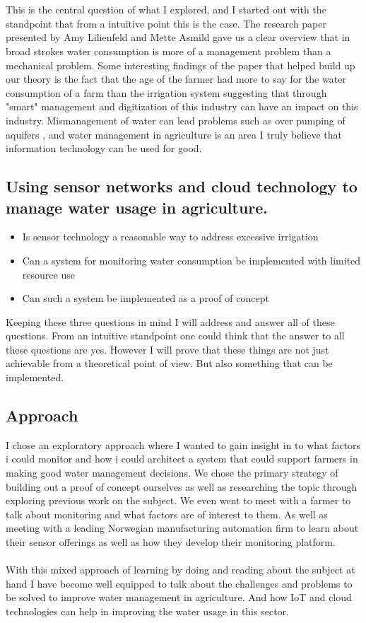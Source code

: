 \documentclass[]{uiophd}
\begin{document}
\\\\
This is the central question of what I explored, and I started out with the standpoint that from a intuitive point this is the case. The research paper presented by Amy Lilienfeld and Mette Asmild gave us a clear overview that in broad strokes water consumption is more of a management problem than a mechanical problem. Some interesting findings of the paper that helped build up our theory is the fact that the age of the farmer had more to say for the water consumption of a farm than the irrigation system suggesting that through "smart" management and digitization of this industry can have an impact on this industry. Mismanagement of water can lead problems such as over pumping of aquifers \parencite{LILIENFELD200773}, and water management in agriculture is an area I truly believe that information technology can be used for good.

\subsection{Using sensor networks and cloud technology to manage water usage in agriculture.}
\begin{itemize}
  \item Is sensor technology a reasonable way to address excessive irrigation
  \item Can a system for monitoring water consumption be implemented with limited resource use
  \item Can such a system be implemented as a proof of concept
\end{itemize}
Keeping these three questions in mind I will address and answer all of these questions. From an intuitive standpoint one could think that the answer to all these questions are yes. However I will prove that these things are not just achievable from a theoretical point of view. But also something that can be implemented.

\subsection{Approach}
I chose an exploratory approach where I wanted to gain insight in to what factors i could monitor and how i could architect a system that could support farmers in making good water management decisions. We chose the primary strategy of building out a proof of concept ourselves as well as researching the topic through exploring previous work on the subject. We even went to meet with a farmer to talk about monitoring and what factors are of interest to them. As well as meeting with a leading Norwegian manufacturing automation firm to learn about their sensor offerings as well as how they develop their monitoring platform.
\\\\
With this mixed approach of learning by doing and reading about the subject at hand I have become well equipped to talk about the challenges and problems to be solved to improve water management in agriculture. And how IoT and cloud technologies can help in improving the water usage in this sector.
\end{document}
